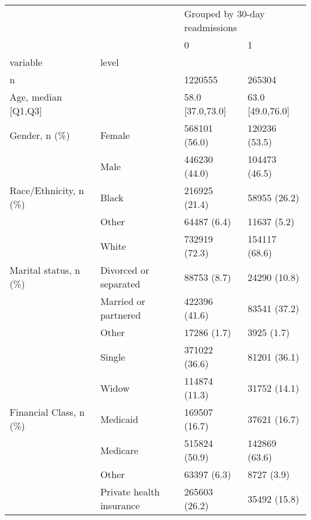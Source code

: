 \begin{tabular}{llll}
\toprule
                                       &   & \multicolumn{2}{l}{Grouped by 30-day readmissions} \\
                                       &   &                              0 &                 1 \\
variable & level &                                &                   \\
\midrule
n &   &                        1220555 &            265304 \\
Age, median [Q1,Q3] &   &               58.0 [37.0,73.0] &  63.0 [49.0,76.0] \\
Gender, n (\%) & Female &                  568101 (56.0) &     120236 (53.5) \\
                                       & Male &                  446230 (44.0) &     104473 (46.5) \\
Race/Ethnicity, n (\%) & Black &                  216925 (21.4) &      58955 (26.2) \\
                                       & Other &                    64487 (6.4) &       11637 (5.2) \\
                                       & White &                  732919 (72.3) &     154117 (68.6) \\
Marital status, n (\%) & Divorced or separated &                    88753 (8.7) &      24290 (10.8) \\
                                       & Married or partnered &                  422396 (41.6) &      83541 (37.2) \\
                                       & Other &                    17286 (1.7) &        3925 (1.7) \\
                                       & Single &                  371022 (36.6) &      81201 (36.1) \\
                                       & Widow &                  114874 (11.3) &      31752 (14.1) \\
Financial Class, n (\%) & Medicaid &                  169507 (16.7) &      37621 (16.7) \\
                                       & Medicare &                  515824 (50.9) &     142869 (63.6) \\
                                       & Other &                    63397 (6.3) &        8727 (3.9) \\
                                       & Private health insurance &                  265603 (26.2) &      35492 (15.8) \\

\end{tabular}

